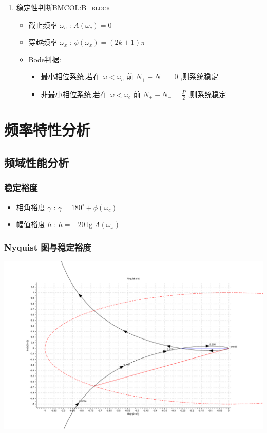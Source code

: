 \documentclass[table]{article}
\begin{document}
\begin{enumerate}
\item 稳定性判断\hfill{}\textsc{BMCOL:B\_block}
\label{sec:org150b73c}
\begin{itemize}
\item 截止频率 \(\omega_c\) : \(A(\omega_c)=0\)
\item 穿越频率 \(\omega_x\) : \(\phi(\omega_x)=(2k+1)\pi\)
\item <3->Bode判据:
\begin{itemize}
\item 最小相位系统,若在 \(\omega<\omega_c\) 前 \(N_+-N_-=0\) ,则系统稳定
\item 非最小相位系统,若在 \(\omega<\omega_c\) 前 \(N_+-N_-=\frac{P}{2}\) ,则系统稳定
\end{itemize}
\end{itemize}
\end{enumerate}
\section{频率特性分析}
\label{sec:orgca555b7}
\subsection{频域性能分析}
\label{sec:org60909f2}
\subsubsection{稳定裕度}
\label{sec:org0dfd771}
\begin{itemize}
\item 相角裕度 \(\gamma\) : \(\gamma=180^{\circ}+\phi(\omega_c)\)
\item 幅值裕度 \(h\) : \(h=-20\lg A(\omega_x)\)
\end{itemize}

\subsubsection{Nyquist 图与稳定裕度}
\label{sec:orgfcbcd2a}
\begin{center}
\includegraphics[width=.9\linewidth]{image/margin_nyquist_scilab.pdf}
\end{center}
\end{document}
